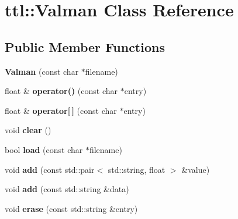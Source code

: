 \hypertarget{classttl_1_1_valman}{\section{ttl\-:\-:Valman Class Reference}
\label{classttl_1_1_valman}
}
\subsection*{Public Member Functions}
\begin{DoxyCompactItemize}
\item 
\hypertarget{classttl_1_1_valman_aef681b474ac0f6f55b8317d64f3d6823}{{\bfseries Valman} (const char $\ast$filename)}\label{classttl_1_1_valman_aef681b474ac0f6f55b8317d64f3d6823}

\item 
\hypertarget{classttl_1_1_valman_a467695f05563fe7b755e1bb902ab7040}{float \& {\bfseries operator()} (const char $\ast$entry)}\label{classttl_1_1_valman_a467695f05563fe7b755e1bb902ab7040}

\item 
\hypertarget{classttl_1_1_valman_aac6e80b897fa949022fa5d286a785a31}{float \& {\bfseries operator\mbox{[}$\,$\mbox{]}} (const char $\ast$entry)}\label{classttl_1_1_valman_aac6e80b897fa949022fa5d286a785a31}

\item 
\hypertarget{classttl_1_1_valman_a4d0d3d70b3d099bd27a153742ea29bc7}{void {\bfseries clear} ()}\label{classttl_1_1_valman_a4d0d3d70b3d099bd27a153742ea29bc7}

\item 
\hypertarget{classttl_1_1_valman_a792541b4f2864eda9ee35f2478b4890e}{bool {\bfseries load} (const char $\ast$filename)}\label{classttl_1_1_valman_a792541b4f2864eda9ee35f2478b4890e}

\item 
\hypertarget{classttl_1_1_valman_ae06bf1be1b34ec62177f79c12e163bba}{void {\bfseries add} (const std\-::pair$<$ std\-::string, float $>$ \&value)}\label{classttl_1_1_valman_ae06bf1be1b34ec62177f79c12e163bba}

\item 
\hypertarget{classttl_1_1_valman_a94f8a3ddd50fd4be44997145e06b4ff1}{void {\bfseries add} (const std\-::string \&data)}\label{classttl_1_1_valman_a94f8a3ddd50fd4be44997145e06b4ff1}

\item 
\hypertarget{classttl_1_1_valman_add2a2e1e51491ab9d596927d0adb4267}{void {\bfseries erase} (const std\-::string \&entry)}\label{classttl_1_1_valman_add2a2e1e51491ab9d596927d0adb4267}


\end{DoxyCompactItemize}
